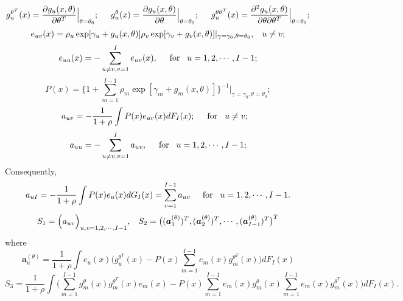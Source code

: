 \documentclass[12]{interact}
\theoremstyle{plain}%
\theoremstyle{definition}
\theoremstyle{remark}
\begin{document}
\begin{equation}
	g_u^{\theta^T}(x)=\frac{\partial g_u(x,\theta)}{\partial \theta^T}\Big|_{\theta=\theta_0};\hspace{5mm}g_u^{\theta}(x)=\frac{\partial
		g_u(x,\theta)}{\partial \theta}\Big|_{\theta=\theta_0};
	\hspace{5mm}g_u^{\theta\theta^T}(x)=\frac{\partial^2
		g_u(x,\theta)}{\partial \theta\partial \theta^T}\Big|_{\theta=\theta_0};\label{g_derivative}
\end{equation}
$$
e_{uv}(x)=\rho_u\exp[\gamma_{u}+ g_u(x,\theta)]\rho_v\exp[\gamma_{v}+g_v(x,\theta)]|_{\gamma=\gamma_0,
	\theta=\theta_0},\hspace{3mm}u\ne v;\label{e_uv}
$$
$$
e_{uu}(x)=-\sum_{u \ne v, v=1}^{I}e_{uv}(x),\hspace{5mm}\mbox{for}\hspace{3mm}u=1,2,\cdots,I-1;
$$
\begin{equation}
	P(x)=\{1+\sum_{m=1}^{I-1 } \rho_m\exp[\gamma_{m}+g_m(x,\theta)]\}^{-1}\big|_{\gamma=\gamma_0,
		\theta=\theta_0};\label{P}
\end{equation}
$$
a_{uv}=-\frac{1}{1+\rho}\int P(x)e_{uv}(x)dF_I(x);\hspace{5mm}\mbox{for} \hspace{3mm} u \ne v;\hspace{3mm}
$$
$$
a_{uu}=-\sum_{u\ne v, v=1}^I a_{uv}, \hspace{5mm}\mbox{for}\hspace{3mm}u=1,2,\cdots,I-1;
$$
Consequently,
$$
a_{uI}=-\frac{1}{1+\rho}\int P(x)e_{u}(x)dG_I(x) =\sum_{v=1}^{I-1}a_{uv}\hspace{5mm}\mbox{for} \hspace{3mm}
u=1,2,\cdots,I-1.
$$
\begin{equation}
	S_1=\Big(a_{uv} \Big)_{u,v=1, 2, \cdots, I-1}, \hspace{3mm} S_2=\big((\bm{a}_1^{(\theta)})^T,(\bm{a}_2^{(\theta)})^T,\cdots,
	(\bm{a}_{I-1}^{(\theta)})^T  \big)^T\label{S1_S2}
\end{equation}
where
$$
\bm{a}_u^{(\theta)}=\frac{1}{1+\rho} \int
e_{u}(x)\Big(g_u^{\theta^T}(x)-P(x)\sum_{m=1}^{I-1}e_{m}(x)g_m^{\theta^T}(x)\Big)dF_I(x)
$$
\begin{equation}
	S_3=\frac{1}{1+\rho}\int\Big(\sum_{m=1}^{I-1}g_m^{\theta}(x)g_m^{\theta^T}(x)e_m(x)
	-P(x)\sum_{m=1}^{I-1}e_m(x)g_m^{\theta}(x)\sum_{m=1}^{I-1}e_m(x)g_m^{\theta^T}(x)\Big)dF_I(x).\label{S3}
\end{equation}
\end{document}
